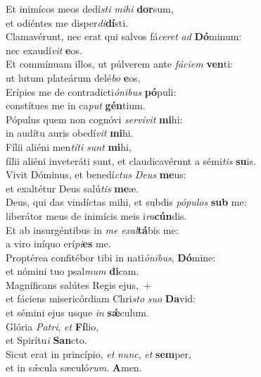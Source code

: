 \evenverse Et inimícos meos dedí\textit{sti} \textit{mi}\textit{hi} \textbf{dor}sum,~\*\\
\evenverse et odiéntes me disper\textit{di}\textbf{dí}sti.\\
\oddverse Clamavérunt, nec erat qui salvos fá\textit{ce}\textit{ret} \textit{ad} \textbf{Dó}minum:~\*\\
\oddverse nec exaudí\textit{vit} \textbf{e}os.\\
\evenverse Et commínuam illos, ut púlverem ante \textit{fá}\textit{ci}\textit{em} \textbf{ven}ti:~\*\\
\evenverse ut lutum plateárum delé\textit{bo} \textbf{e}os.\\
\oddverse Erípies me de contradicti\textit{ó}\textit{ni}\textit{bus} \textbf{pó}puli:~\*\\
\oddverse constítues me in ca\textit{put} \textbf{gén}tium.\\
\evenverse Pópulus quem non cognóvi \textit{ser}\textit{ví}\textit{vit} \textbf{mi}hi:~\*\\
\evenverse in audítu auris obedí\textit{vit} \textbf{mi}hi.\\
\oddverse Fílii aliéni men\textit{tí}\textit{ti} \textit{sunt} \textbf{mi}hi,~\*\\
\oddverse fílii aliéni inveteráti sunt, et claudicavérunt a sémi\textit{tis} \textbf{su}is.\\
\evenverse Vivit Dóminus, et benedí\textit{ctus} \textit{De}\textit{us} \textbf{me}us:~\*\\
\evenverse et exaltétur Deus salú\textit{tis} \textbf{me}æ.\\
\oddverse Deus, qui das vindíctas mihi, et subdis \textit{pó}\textit{pu}\textit{los} \textbf{sub} me:~\*\\
\oddverse liberátor meus de inimícis meis i\textit{ra}\textbf{cún}dis.\\
\evenverse Et ab insurgéntibus in \textit{me} \textit{e}\textit{xal}\textbf{tá}bis me:~\*\\
\evenverse a viro iníquo erí\textit{pi}\textbf{es} me.\\
\oddverse Proptérea confitébor tibi in nati\textit{ó}\textit{ni}\textit{bus}, \textbf{Dó}mine:~\*\\
\oddverse et nómini tuo psal\textit{mum} \textbf{di}cam.\\
\evenverse Magníficans salútes Regis ejus,~+\\
\evenverse  et fáciens misericórdiam Chri\textit{sto} \textit{su}\textit{o} \textbf{Da}vid:~\*\\
\evenverse et sémini ejus usque \textit{in} \textbf{sǽ}culum.\\
\oddverse Glória \textit{Pa}\textit{tri}, \textit{et} \textbf{Fí}lio,~\*\\
\oddverse et Spirítu\textit{i} \textbf{San}cto.\\
\evenverse Sicut erat in princípio, \textit{et} \textit{nunc}, \textit{et} \textbf{sem}per,~\*\\
\evenverse et in sǽcula sæculó\textit{rum}. \textbf{A}men.\\
